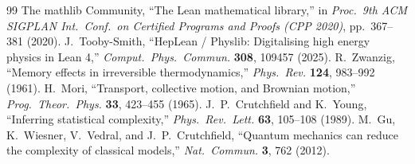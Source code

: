 \documentclass[11pt,a4paper]{article}
\theoremstyle{definition}
\begin{document}
\begin{thebibliography}{99}
 The mathlib Community, ``The Lean mathematical library,'' in \emph{Proc.\ 9th ACM SIGPLAN Int.\ Conf.\ on Certified Programs and Proofs (CPP 2020)}, pp.\ 367--381 (2020).
 J.\ Tooby-Smith, ``HepLean / Physlib: Digitalising high energy physics in Lean 4,'' \emph{Comput.\ Phys.\ Commun.} \textbf{308}, 109457 (2025).
 R.\ Zwanzig, ``Memory effects in irreversible thermodynamics,'' \emph{Phys.\ Rev.} \textbf{124}, 983--992 (1961).
 H.\ Mori, ``Transport, collective motion, and Brownian motion,'' \emph{Prog.\ Theor.\ Phys.} \textbf{33}, 423--455 (1965).
 J.\ P.\ Crutchfield and K.\ Young, ``Inferring statistical complexity,'' \emph{Phys.\ Rev.\ Lett.} \textbf{63}, 105--108 (1989).
 M.\ Gu, K.\ Wiesner, V.\ Vedral, and J.\ P.\ Crutchfield, ``Quantum mechanics can reduce the complexity of classical models,'' \emph{Nat.\ Commun.} \textbf{3}, 762 (2012).
\end{thebibliography}
\end{document}
